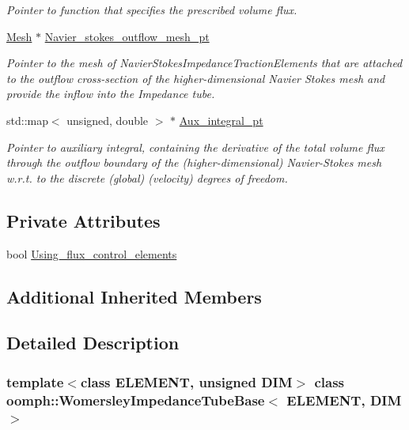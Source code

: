 \begin{DoxyCompactItemize}
\begin{DoxyCompactList}\small\item\em Pointer to function that specifies the prescribed volume flux. \end{DoxyCompactList}\item 
\hyperlink{classoomph_1_1Mesh}{Mesh} $\ast$ \hyperlink{classoomph_1_1WomersleyImpedanceTubeBase_a59b41acf37d7bfce3c1a8676304915d7}{Navier\+\_\+stokes\+\_\+outflow\+\_\+mesh\+\_\+pt}
\begin{DoxyCompactList}\small\item\em Pointer to the mesh of Navier\+Stokes\+Impedance\+Traction\+Elements that are attached to the outflow cross-\/section of the higher-\/dimensional Navier Stokes mesh and provide the inflow into the Impedance tube. \end{DoxyCompactList}\item 
std\+::map$<$ unsigned, double $>$ $\ast$ \hyperlink{classoomph_1_1WomersleyImpedanceTubeBase_ad8b569812e4c3fa5ae6c1064689bb2fe}{Aux\+\_\+integral\+\_\+pt}
\begin{DoxyCompactList}\small\item\em Pointer to auxiliary integral, containing the derivative of the total volume flux through the outflow boundary of the (higher-\/dimensional) Navier-\/\+Stokes mesh w.\+r.\+t. to the discrete (global) (velocity) degrees of freedom. \end{DoxyCompactList}\end{DoxyCompactItemize}
\subsection*{Private Attributes}
\begin{DoxyCompactItemize}
\item 
bool \hyperlink{classoomph_1_1WomersleyImpedanceTubeBase_a01ab12fe40acf7a477b892e7c7cd0831}{Using\+\_\+flux\+\_\+control\+\_\+elements}
\end{DoxyCompactItemize}
\subsection*{Additional Inherited Members}


\subsection{Detailed Description}
\subsubsection*{template$<$class E\+L\+E\+M\+E\+NT, unsigned D\+IM$>$\newline
class oomph\+::\+Womersley\+Impedance\+Tube\+Base$<$ E\+L\+E\+M\+E\+N\+T, D\+I\+M $>$}

